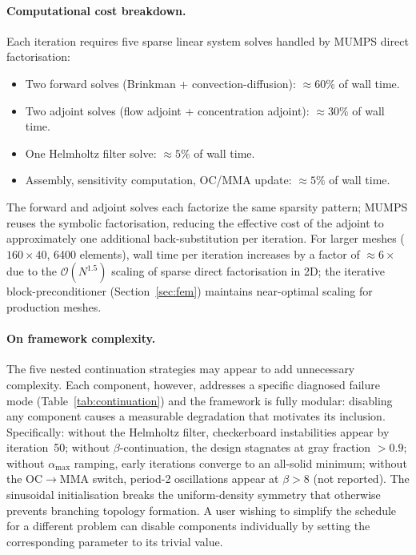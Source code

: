 \paragraph{Computational cost breakdown.}
Each iteration requires five sparse linear system solves handled by
MUMPS direct factorisation:
\begin{itemize}\itemsep1pt
    \item Two forward solves (Brinkman + convection-diffusion):
          $\approx60\%$ of wall time.
    \item Two adjoint solves (flow adjoint + concentration adjoint):
          $\approx30\%$ of wall time.
    \item One Helmholtz filter solve: $\approx5\%$ of wall time.
    \item Assembly, sensitivity computation, OC/MMA update:
          $\approx5\%$ of wall time.
\end{itemize}
The forward and adjoint solves each factorize the same sparsity
pattern; MUMPS reuses the symbolic factorisation, reducing
the effective cost of the adjoint to approximately one
additional back-substitution per iteration.
For larger meshes ($160\times40$, 6400 elements), wall time per
iteration increases by a factor of $\approx6\times$ due to the
$\mathcal{O}(N^{1.5})$ scaling of sparse direct factorisation
in 2D; the iterative block-preconditioner (Section~\ref{sec:fem})
maintains near-optimal scaling for production meshes.

\paragraph{On framework complexity.}
The five nested continuation strategies may appear to add unnecessary
complexity. Each component, however, addresses a specific diagnosed
failure mode (Table~\ref{tab:continuation}) and the framework is
fully modular: disabling any component causes a measurable degradation
that motivates its inclusion.
Specifically: without the Helmholtz filter, checkerboard instabilities
appear by iteration~50; without $\beta$-continuation, the design
stagnates at gray fraction $>0.9$; without $\alpha_{\max}$ ramping,
early iterations converge to an all-solid minimum;
without the OC$\to$MMA switch, period-2 oscillations appear at
$\beta>8$ (not reported).
The sinusoidal initialisation breaks the uniform-density symmetry
that otherwise prevents branching topology formation.
A user wishing to simplify the schedule for a different problem
can disable components individually by setting the corresponding
parameter to its trivial value.

